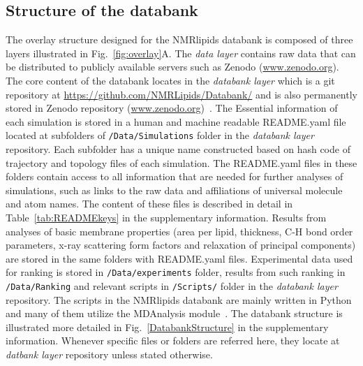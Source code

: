 \documentclass[fleqn,10pt]{wlscirep}
\begin{document}
\subsection{Structure of the databank}
The overlay structure designed for the NMRlipids databank is composed of three layers illustrated in Fig.~\ref{fig:overlay}A. The {\it data layer} contains raw data that can be distributed to publicly available servers such as Zenodo (\url{www.zenodo.org}). The core content of the databank locates in the {\it databank layer} which is a git repository at \url{https://github.com/NMRLipids/Databank/} and is also permanently stored in Zenodo repository (\url{www.zenodo.org})~\cite{??}. The Essential information of each simulation is stored in a human and machine readable README.yaml file located at subfolders of \texttt{/Data/Simulations} folder in the {\it databank layer} repository. Each subfolder has a unique name constructed based on hash code of trajectory and topology files of each simulation. The README.yaml files in these folders contain access to all information that are needed for further analyses of simulations, such as links to the raw data and affiliations of universal molecule and atom names. The content of these files is described in detail in Table~\ref{tab:READMEkeys} in the supplementary information. Results from analyses of basic membrane properties (area per lipid, thickness, C-H bond order parameters, x-ray scattering form factors and relaxation of principal components) are stored in the same folders with README.yaml files. Experimental data used for ranking is stored in \texttt{/Data/experiments} folder, results from such ranking in \texttt{/Data/Ranking} and  relevant scripts in \texttt{/Scripts/} folder in the {\it databank layer} repository. 
The scripts in the NMRlipids databank are mainly written in Python and many of them utilize the MDAnalysis module~\cite{gowers2019mdanalysis,michaud2011mdanalysis}. The databank structure is illustrated more detailed in Fig.~\ref{DatabankStructure} in the supplementary information. Whenever specific files or folders are referred here, they locate at {\it datbank layer} repository unless stated otherwise. 
\end{document}
